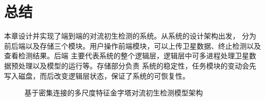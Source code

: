 \section{总结}
本章设计并实现了端到端的对流初生检测的系统。从系统的设计架构出发，
分为前后端以及存储三个模块。用户操作前端模块，可以上传卫星数据、终止检测以及查看检测结果。后端
主要代表系统的整个逻辑层，逻辑层中可多进程处理卫星数据预处理以及模型的运行等。存储部分负责
系统的稳定性，任务模块的变动会先写入磁盘，而后改变逻辑层状态，保证了系统的可恢复性。

\begin{figure}[h]
	\centering
	\caption{基于密集连接的多尺度特征金字塔对流初生检测模型架构}
	\label{RCNN_model}
\end{figure}
